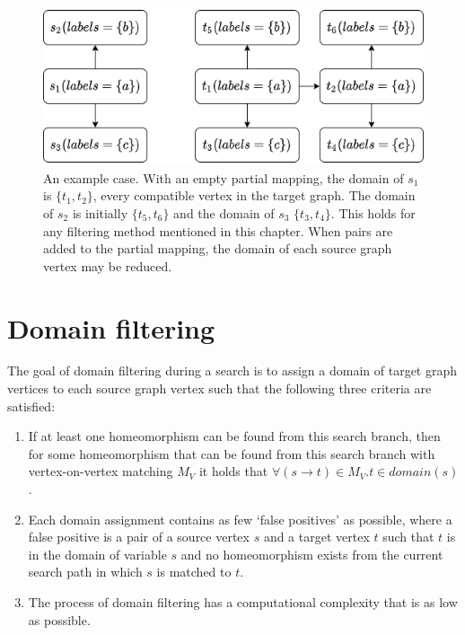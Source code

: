 \begin{figure}
\centering
\includegraphics[scale=0.6]{images/contraction/pruningExampleSimple.png}
\caption{An example case. With an empty partial mapping, the domain of $s_1$ is $\{t_1, t_2\}$, every compatible vertex in the target graph. The domain of $s_2$ is initially $\{t_5, t_6\}$ and the domain of $s_3$ $\{t_3, t_4\}$. This holds for any filtering method mentioned in this chapter. When pairs are added to the partial mapping, the domain of each source graph vertex may be reduced.}
\label{fig:simplePruningExample}
\end{figure}


\section{Domain filtering}
\label{sec:domain-filtering}
The goal of domain filtering during a search is to assign a domain of target graph vertices to each source graph vertex such that the following three criteria are satisfied:

\begin{enumerate}
\item \label{li:complete}If at least one homeomorphism can be found from this search branch, then for some homeomorphism that can be found from this search branch with vertex-on-vertex matching $M_V$ it holds that $\forall (s \to t) \in M_V . t \in \mathit{domain}(s)$.
\item \label{li:falsepositives}Each domain assignment contains as few `false positives' as possible, where a false positive is a pair of a source vertex $s$ and a target vertex $t$ such that $t$ is in the domain of variable $s$ and no homeomorphism exists from the current search path in which $s$ is matched to $t$.
\item \label{li:complexity} The process of domain filtering has a computational complexity that is as low as possible.
\end{enumerate}

